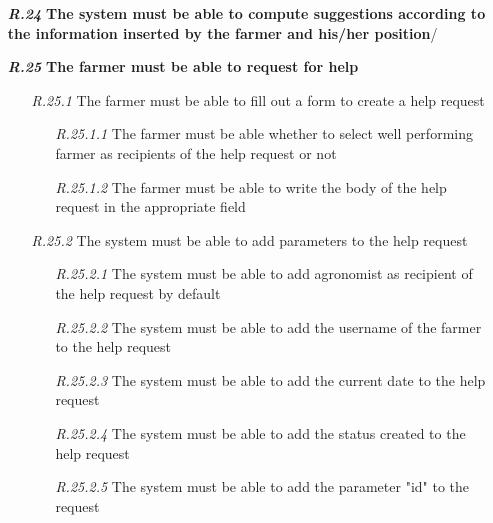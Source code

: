 \begin{itemize}
\begin{itemize}
        \end{itemize}
        \item[\textbf{\textit{R.24}}] \textbf{ The system must be able to compute suggestions according to the information inserted by the farmer and his/her position}/
        \item [\textbf{\textit{R.25}}]\textbf{ The farmer must be able to request for help }
        \begin{itemize}
            \item [\textit{R.25.1}] The farmer must be able to fill out a form to create a help request
            \begin{itemize}
                \item [\textit{R.25.1.1}] The farmer must be able whether to select well performing farmer as recipients of the help request or not
		        \item [\textit{R.25.1.2}] The farmer must be able to write the body of the help request in the appropriate field
            \end{itemize}
            \item [\textit{R.25.2}] The system must be able to add parameters to the help request
            \begin{itemize}
                \item [\textit{R.25.2.1}] The system must be able to add agronomist as recipient of the help request by default
		        \item [\textit{R.25.2.2}] The system must be able to add the username of the farmer to the help request
		        \item [\textit{R.25.2.3}] The system must be able to add the current date to the help request
		        \item [\textit{R.25.2.4}] The system must be able to add the status created to the help request
		        \item [\textit{R.25.2.5}] The system must be able to add the parameter "id" to the request

            \end{itemize}
        \end{itemize}
        	

\end{itemize}
